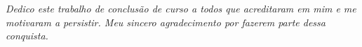 \thispagestyle{empty}

\vspace*{\fill}
\begin{flushright}
	\begin{minipage}{8cm}
		\textit{
			\qquad Dedico este trabalho de conclusão de curso a todos que acreditaram em mim e me motivaram a persistir. Meu sincero agradecimento por fazerem parte dessa conquista.  
		}
	\end{minipage}
\end{flushright}
